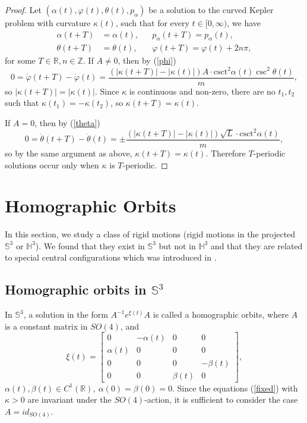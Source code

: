 \documentclass[12pt]{amsart}
\theoremstyle{definition}
\def \mb{\mathbb}
\def \Z{\mb Z}                  %
\def \R{\mb R}                 %
\newcommand {\csct} {\text{csct}}
\def \S{\mb S}        %
\def \H{\mb H}        %
\begin{document}
{\begin{proof}
Let $(\alpha(t), \varphi(t), \theta(t), p_\alpha)$ be a solution to the curved Kepler problem with curvature $\kappa(t)$, such that for every $t \in [0, \infty)$, we have
\begin{align*}
\alpha(t+T)&=\alpha(t), && p_\alpha(t+T)=p_\alpha(t),\\
\theta(t+T)&=\theta(t), && \varphi(t+T)=\varphi(t)+2n\pi,
\end{align*}
for some $T \in \R, n \in \Z$. If $A\neq 0$, then by (\ref{phi}) $$0=\dot{\varphi}(t+T)-\dot{\varphi}(t)=\frac{(|\kappa(t+T)|-|\kappa(t)|) A\cdot\csct^2{\alpha(t)}\csc^2{\theta(t)}}{m},$$
so $|\kappa(t+T)|=|\kappa(t)|$. Since $\kappa$ is continuous and non-zero, there are no $t_1, t_2$ such that $\kappa(t_1)=-\kappa(t_2)$, so $\kappa(t+T)=\kappa(t)$.


If $A=0$, then by (\ref{theta}) $$0=\dot{\theta}(t+T)-\dot{\theta}(t)=\pm\frac{(|\kappa(t+T)|-|\kappa(t)|)\sqrt{L}\cdot\csct^2{\alpha(t)}}{m},$$
so by the same argument as above, $\kappa(t+T)=\kappa(t)$. Therefore $T$-periodic solutions occur only when $\kappa$ is $T$-periodic.
\end{proof}


\section{Homographic Orbits}
In this section, we study a class of rigid motions (rigid motions in the projected $\S^3$ or $\H^3$). We found that they exist in $\S^3$ but not in $\H^3$ and that they are related to special central configurations which was introduced in \cite{Diacu3, DiacuZhu}. 

\subsection{Homographic orbits in $\S^3$}
In $\S^3$, a solution in the form  $A^{-1}e^{\xi(t)}A$ is called a homographic orbits, where $A$ is a constant matrix in  $SO(4)$, and $$\xi(t)=\begin{bmatrix}0 & -\alpha(t) & 0 & 0\\ \alpha(t) & 0 & 0 & 0\\ 0 & 0 & 0 & -\beta(t)\\ 0 & 0 & \beta(t) & 0\end{bmatrix}, $$
$\alpha(t), \beta(t) \in C^1(\R),\ \alpha(0)= \beta(0)=0.$  Since the equations (\ref{fixed}) with $\kappa >0$ are invariant under the $SO(4)$-action, it is sufficient to consider the case $A=id_{SO(4)}$.

}
\end{document}
